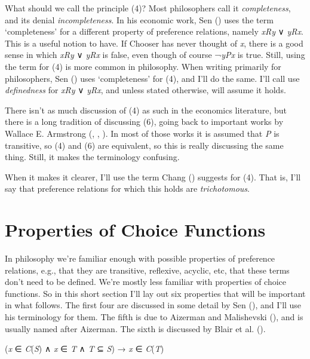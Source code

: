 \documentclass[
  11pt,
  letterpaper,
  DIV=11,
  numbers=noendperiod,
  twoside]{scrartcl}
\providecommand{\tightlist}{%
  \setlength{\itemsep}{0pt}\setlength{\parskip}{0pt}}
\begin{document}
What should we call the principle (4)? Most philosophers call it
\emph{completeness}, and its denial \emph{incompleteness}. In his
economic work, Sen () uses the
term `completeness' for a different property of preference relations,
namely \emph{xRy} ∨ \emph{yRx}. This is a useful notion to have. If
Chooser has never thought of \emph{x}, there is a good sense in which
\emph{xRy} ∨ \emph{yRx} is false, even though of course ¬\emph{yPx} is
true. Still, using the term for (4) is more common in philosophy. When
writing primarily for philosophers, Sen ()
uses `completeness' for (4), and I'll do the same. I'll call use
\emph{definedness} for \emph{xRy} ∨ \emph{yRx}, and unless stated
otherwise, will assume it holds.

There isn't as much discussion of (4) as such in the economics
literature, but there is a long tradition of discussing (6), going back
to important works by Wallace E. Armstrong
(, ,
). In most of those works it is
assumed that \emph{P} is transitive, so (4) and (6) are equivalent, so
this is really discussing the same thing. Still, it makes the
terminology confusing.

When it makes it clearer, I'll use the term Chang
() suggests for (4). That is, I'll say
that preference relations for which this holds are \emph{trichotomous}.

\section{Properties of Choice Functions}\label{sec-properties}

In philosophy we're familiar enough with possible properties of
preference relations, e.g., that they are transitive, reflexive,
acyclic, etc, that these terms don't need to be defined. We're mostly
less familiar with properties of choice functions. So in this short
section I'll lay out six properties that will be important in what
follows. The first four are discussed in some detail by Sen
(), and I'll use his
terminology for them. The fifth is due to Aizerman and Malishevski
(), and is usually named after
Aizerman. The sixth is discussed by Blair et al.
().

\begin{description}
\tightlist
\item[Property α]
(\emph{x} ∈ \emph{C}(\emph{S}) ∧ \emph{x} ∈ \emph{T} ∧ \emph{T} ⊆
\emph{S}) → \emph{x} ∈ \emph{C}(\emph{T})
\end{description}
\end{document}
